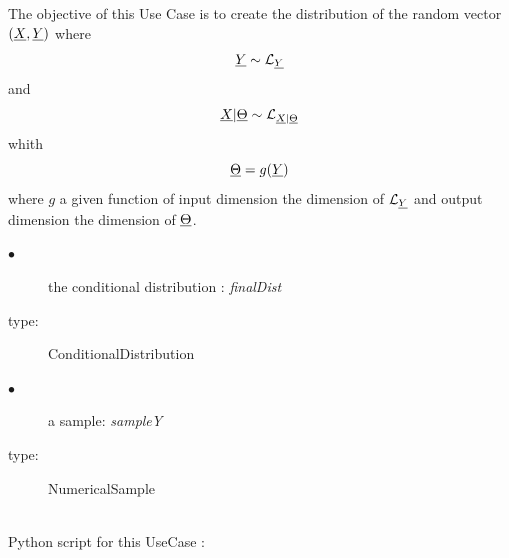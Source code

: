 \renewcommand{\filename}{docUC_InputBayesian_BayesDist.tex}
\renewcommand{\filetitle}{UC : Creation of a multivariate distribution through conditioning}

\HeaderIIILevel




The objective of this Use Case is to create  the distribution of the random vector $({\underline{X}},{\underline{Y}})$ where $${\underline{Y}} \sim {\mathcal L}_{{\underline{Y}}}$$ and $${\underline{X}}|{\underline{\Theta}} \sim {\mathcal L}_{{\underline{X}}|{\underline{\Theta}}}$$  whith $${\underline{\Theta}}=g({\underline{Y}})$$ where $g$ a given function of input dimension the dimension of ${\mathcal L}_{{\underline{Y}}}$ and output dimension the dimension of ${\underline{\Theta}}$.


{
  \begin{description}
  \item[$\bullet$] the conditional distribution : {\itshape  finalDist}
  \item[type:]  ConditionalDistribution
  \item[$\bullet$] a sample: {\itshape sampleY}
  \item[type:]  NumericalSample
  \end{description}
}

\textspace\\
Python script for this UseCase :


